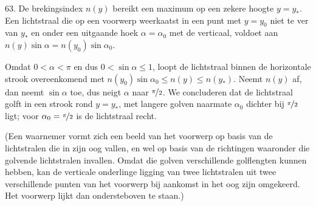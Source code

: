 \begin{problem}{63.}
    De brekingsindex $n(y)$ bereikt een maximum op een zekere hoog\-te $y = y_*$. Een lichtstraal die op een voorwerp weerkaatst in een punt met $y = y_0$ niet te ver van $y_*$ en onder een uitgaande hoek $\alpha = {\alpha}_0$ met de verticaal, voldoet aan $n(y) \sin \alpha = n(y_0) \sin {\alpha}_0$.

    Omdat $0 < \alpha < \pi$ en dus $0 < \sin \alpha \leq 1$, loopt de lichtstraal binnen de horizontale strook overeenkomend met \mbox{$n(y_0) \sin {\alpha}_0 \leq n(y) \leq n(y_*)$}. Neemt $n(y)$ af, dan neemt $\sin \alpha$ toe, dus neigt $\alpha$ naar $\nicefrac{\pi}{2}$. We conclu\-deren dat de lichtstraal golft in een strook rond $y = y_*$, met langere golven naarmate ${\alpha}_0$ dichter bij $\nicefrac{\pi}{2}$ ligt; voor ${\alpha}_0 = \nicefrac{\pi}{2}$ is de lichtstraal recht.

    (Een waarnemer vormt zich een beeld van het voorwerp op basis van de lichtstralen die in zijn oog vallen, en wel op basis van de richtingen waaronder die golvende lichtstralen invallen. Omdat die golven verschillende golflengten kunnen hebben, kan de verticale on\-derlinge ligging van twee lichtstralen uit twee verschillende punten van het voorwerp bij aankomst in het oog zijn omgekeerd. Het voorwerp lijkt dan ondersteboven te staan.)
\end{problem}

\clearpage

